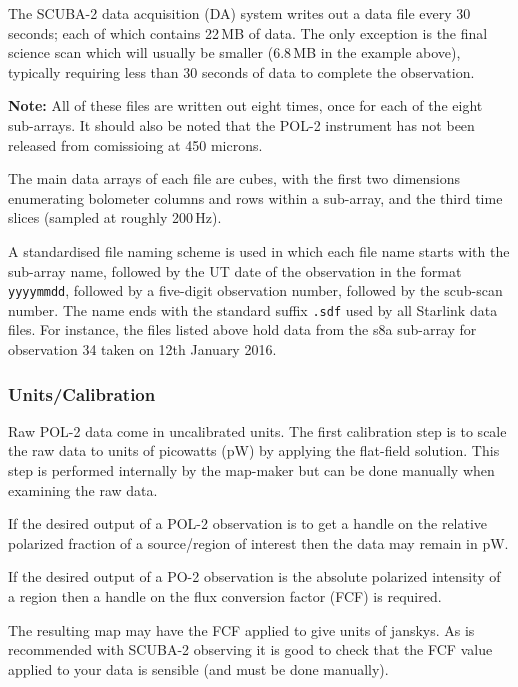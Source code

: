 The SCUBA-2 data acquisition (DA) system writes out a data file every
30 seconds; each of which contains 22\,MB of data. The only exception
is the final science scan which will usually be smaller (6.8\,MB in
the example above), typically requiring less than 30 seconds of data
to complete the observation.

\textbf{Note:} All of these files are written out eight times, once
for each of the eight sub-arrays. It should also be noted that the POL-2 instrument has not 
been released from comissioing at 450 microns.

The main data arrays of each file are cubes, with the first two
dimensions enumerating bolometer columns and rows within a sub-array,
and the third time slices (sampled at roughly 200\,Hz).

A standardised file naming scheme is used in which each file name starts
with the sub-array name, followed by the UT date of the observation in
the format \texttt{yyyymmdd}, followed by a five-digit observation
number, followed by the scub-scan number. The name ends with the standard
suffix \texttt{.sdf} used by all Starlink data files. For instance, the files
listed above hold data from the s8a sub-array for observation 34 taken on
12th January 2016.




\subsubsection*{Units/Calibration}

Raw POL-2 data come in uncalibrated units. The first calibration
step is to scale the raw data to units of picowatts (pW)
by applying the flat-field solution. This step is performed internally
by the map-maker but can be done manually when examining the raw
data.

If the desired output of a POL-2 observation is to get a handle on the relative
polarized fraction of a source/region of interest then the data may remain in
pW.

If the desired output of a PO-2 observation is the absolute polarized intensity
of a region then a handle on the flux conversion factor (FCF) is required.

The resulting map may have the FCF applied to give units of janskys. As is 
recommended with SCUBA-2 observing it is good to check that the FCF value 
applied to your data is sensible (and must be done manually).

